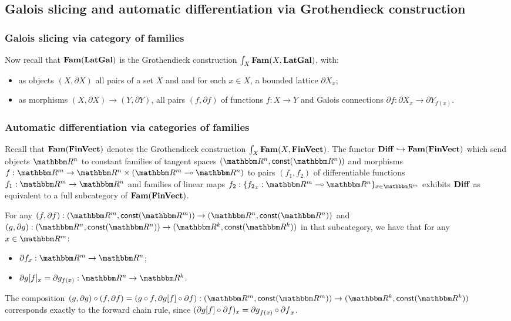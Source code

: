\subsection{Galois slicing and automatic differentiation via Grothendieck construction}

\subsubsection{Galois slicing via category of families}

Now recall that $\mathbf{Fam}(\mathbf{LatGal})$ is the Grothendieck construction $\int_{X}\mathbf{Fam}(X, \mathbf{LatGal})$, with:
\begin{itemize}
\item as objects $(X, \partial X)$ all pairs of a set $X$ and and for each $x \in X$, a bounded lattice
$\partial X_x$;
\item as morphisms $(X, \partial X) \to (Y, \partial Y)$, all pairs $(f, \partial f)$ of functions $f: X \to
Y$ and Galois connections $\partial f: \partial X_x \to \partial Y_{f(x)}$.
\end{itemize}

\subsubsection{Automatic differentiation via categories of families}

Recall that $\mathbf{Fam}(\mathbf{FinVect})$ denotes the Grothendieck construction $\int_{X}\mathbf{Fam}(X, \mathbf{FinVect})$. The
functor $\mathbf{Diff} \hookrightarrow \mathbf{Fam}(\mathbf{FinVect})$ which send objects $\RR^n$ to constant families of tangent
spaces $(\RR^n, \const(\RR^n))$ and morphisms $f: \RR^m \to \RR^n \times (\RR^m \linearto \RR^n)$ to pairs
$(f_1, f_2)$ of differentiable functions $f_1: \RR^m \to \RR^n$ and families of linear maps $f_2: \{{f_2}_x:
\RR^m \linearto \RR^n\}_{x \in \RR^m}$ exhibits $\mathbf{Diff}$ as equivalent to a full subcategory of
$\mathbf{Fam}(\mathbf{FinVect})$.

For any $(f, \partial f): (\RR^m, \const(\RR^m)) \to (\RR^n, \const(\RR^n))$ and $(g, \partial g): (\RR^n,
\const(\RR^n)) \to (\RR^k, \const(\RR^k))$ in that subcategory, we have that for any $x \in \RR^m$:
\begin{itemize}
\item $\partial f_x: \RR^m \to \RR^n$;
\item $\reindex{\partial g}{f}_x = \partial g_{f(x)}: \RR^n \to \RR^k$.
\end{itemize}

\noindent The composition $(g, \partial g) \comp (f, \partial f) = (g \comp f, \reindex{\partial g}{f} \comp
\partial f): (\RR^m, \const(\RR^m)) \to (\RR^k, \const(\RR^k))$ corresponds exactly to the forward chain rule,
since $(\partial g[f] \circ \partial f)_x = {\partial g}_{f(x)} \circ {\partial f}_x$.
